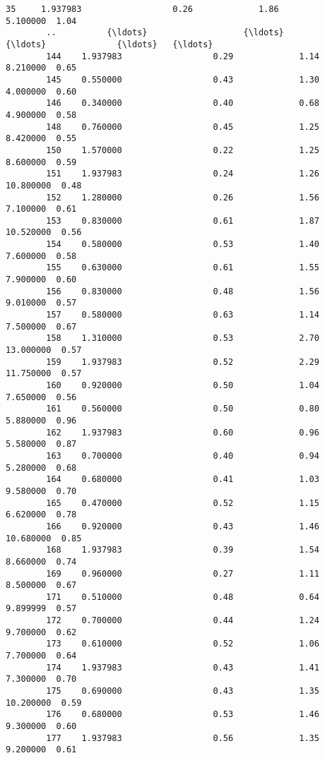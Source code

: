 \documentclass[11pt]{article}
\begin{document}
\begin{Verbatim}[commandchars=\\\{\}]
        35     1.937983                  0.26             1.86         5.100000  1.04   
        ..          {\ldots}                   {\ldots}              {\ldots}              {\ldots}   {\ldots}   
        144    1.937983                  0.29             1.14         8.210000  0.65   
        145    0.550000                  0.43             1.30         4.000000  0.60   
        146    0.340000                  0.40             0.68         4.900000  0.58   
        148    0.760000                  0.45             1.25         8.420000  0.55   
        150    1.570000                  0.22             1.25         8.600000  0.59   
        151    1.937983                  0.24             1.26        10.800000  0.48   
        152    1.280000                  0.26             1.56         7.100000  0.61   
        153    0.830000                  0.61             1.87        10.520000  0.56   
        154    0.580000                  0.53             1.40         7.600000  0.58   
        155    0.630000                  0.61             1.55         7.900000  0.60   
        156    0.830000                  0.48             1.56         9.010000  0.57   
        157    0.580000                  0.63             1.14         7.500000  0.67   
        158    1.310000                  0.53             2.70        13.000000  0.57   
        159    1.937983                  0.52             2.29        11.750000  0.57   
        160    0.920000                  0.50             1.04         7.650000  0.56   
        161    0.560000                  0.50             0.80         5.880000  0.96   
        162    1.937983                  0.60             0.96         5.580000  0.87   
        163    0.700000                  0.40             0.94         5.280000  0.68   
        164    0.680000                  0.41             1.03         9.580000  0.70   
        165    0.470000                  0.52             1.15         6.620000  0.78   
        166    0.920000                  0.43             1.46        10.680000  0.85   
        168    1.937983                  0.39             1.54         8.660000  0.74   
        169    0.960000                  0.27             1.11         8.500000  0.67   
        171    0.510000                  0.48             0.64         9.899999  0.57   
        172    0.700000                  0.44             1.24         9.700000  0.62   
        173    0.610000                  0.52             1.06         7.700000  0.64   
        174    1.937983                  0.43             1.41         7.300000  0.70   
        175    0.690000                  0.43             1.35        10.200000  0.59   
        176    0.680000                  0.53             1.46         9.300000  0.60   
        177    1.937983                  0.56             1.35         9.200000  0.61   
        

\end{Verbatim}
\end{document}
